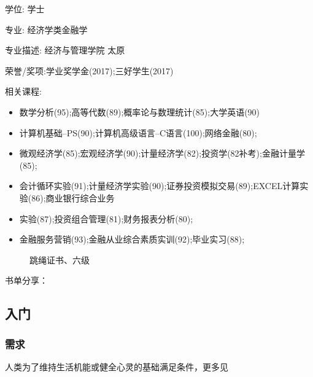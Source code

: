\documentclass[letterpaper,10pt,english]{sphinxmanual}
\begin{document}
学位: 学士

专业: 经济学类\sphinxhyphen{}金融学

专业描述: 经济与管理学院 太原

荣誉/奖项:学业奖学金(2017);三好学生(2017)

相关课程:
\begin{itemize}
\item {} 
数学分析(95);高等代数(89);概率论与数理统计(85);大学英语(90)

\item {} 
计算机基础–PS(90);计算机高级语言–C语言(100);网络金融(80);

\item {} 
微观经济学(85);宏观经济学(90);计量经济学(82);投资学(82补考);金融计量学(85);

\item {} 
会计循环实验(91);计量经济学实验(90);证券投资模拟交易(89);EXCEL计算实验(86);商业银行综合业务

\item {} 
实验(87);投资组合管理(81);财务报表分析(80);

\item {} 
金融服务营销(93);金融从业综合素质实训(92);毕业实习(88);

\end{itemize}

\begin{figure}[H]
\centering
\capstart

\noindent{}
\caption{跳绳证书、六级}\label{\detokenize{get_started:id17}}\end{figure}

书单分享： 


\subsection{入门}
\label{\detokenize{chapter_introduction/index:chap-intro}}\label{\detokenize{chapter_introduction/index:id1}}\label{\detokenize{chapter_introduction/index::doc}}

\subsubsection{需求}
\label{\detokenize{chapter_introduction/need:need}}\label{\detokenize{chapter_introduction/need:id1}}\label{\detokenize{chapter_introduction/need::doc}}
人类为了维持生活机能或健全心灵的基础满足条件，更多见%
\begin{footnote}[22]\sphinxAtStartFootnote
{}
%
\end{footnote}
\end{document}
